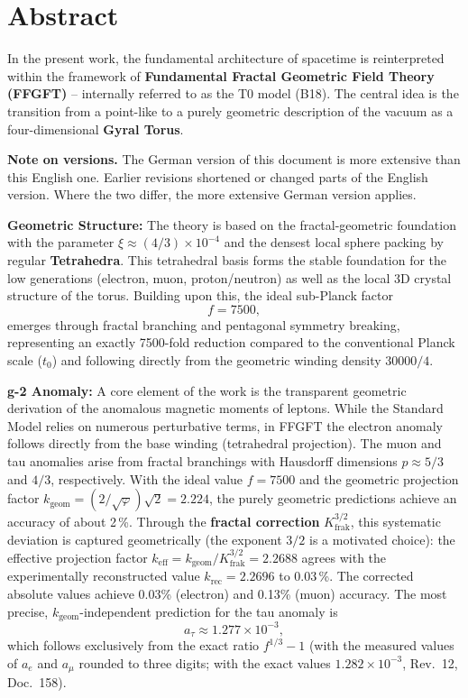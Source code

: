 \section*{Abstract}
		In the present work, the fundamental architecture of spacetime is reinterpreted within the framework of \textbf{Fundamental Fractal Geometric Field Theory (FFGFT)} – internally referred to as the T0 model (B18). The central idea is the transition from a point-like to a purely geometric description of the vacuum as a four-dimensional \textbf{Gyral Torus}.

	\medskip\noindent\textbf{Note on versions.} The German version of this document is more extensive than this English one. Earlier revisions shortened or changed parts of the English version. Where the two differ, the more extensive German version applies.

		
		\textbf{Geometric Structure:} The theory is based on the fractal-geometric foundation with the parameter $\xi \approx (4/3)\times 10^{-4}$ and the densest local sphere packing by regular \textbf{Tetrahedra}. This tetrahedral basis forms the stable foundation for the low generations (electron, muon, proton/neutron) as well as the local 3D crystal structure of the torus. Building upon this, the ideal sub-Planck factor
		\begin{equation*}
			f = 7500,
		\end{equation*}
		emerges through fractal branching and pentagonal symmetry breaking, representing an exactly 7500-fold reduction compared to the conventional Planck scale ($t_0$) and following directly from the geometric winding density $30000/4$.

		\textbf{g-2 Anomaly:} A core element of the work is the transparent geometric derivation of the anomalous magnetic moments of leptons. While the Standard Model relies on numerous perturbative terms, in FFGFT the electron anomaly follows directly from the base winding (tetrahedral projection). The muon and tau anomalies arise from fractal branchings with Hausdorff dimensions $p \approx 5/3$ and $4/3$, respectively. With the ideal value $f = 7500$ and the geometric projection factor $k_\text{geom} = (2/\sqrt{\varphi})\sqrt{2} = 2.224$, the purely geometric predictions achieve an accuracy of about 2\,\%. Through the \textbf{fractal correction} $K_\text{frak}^{3/2}$, this systematic deviation is captured geometrically (the exponent $3/2$ is a motivated choice): the effective projection factor $k_\text{eff} = k_\text{geom}/K_\text{frak}^{3/2} = 2.2688$ agrees with the experimentally reconstructed value $k_\text{rec} = 2.2696$ to 0.03\,\%. The corrected absolute values achieve 0.03\% (electron) and 0.13\% (muon) accuracy. The most precise, $k_\text{geom}$-independent prediction for the tau anomaly is
		\begin{equation*}
			a_\tau \approx 1.277 \times 10^{-3},
		\end{equation*}
		which follows exclusively from the exact ratio $f^{1/3} - 1$ (with the measured values of $a_e$ and $a_\mu$ rounded to three digits; with the exact values $1.282 \times 10^{-3}$, Rev.~12, Doc.~158).
		
